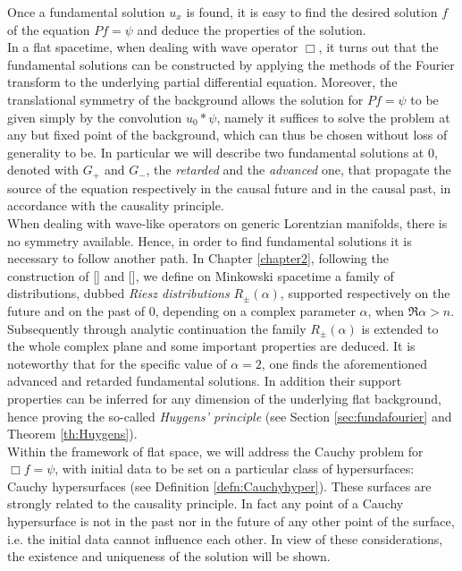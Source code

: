 \noindent Once a fundamental solution $u_x$ is found, it is easy to find the desired solution $f$ of the equation $Pf=\psi$ and deduce the properties of the solution.\\
In a flat spacetime, when dealing with wave operator $\Box$, it turns out that the fundamental solutions can be constructed by applying the methods of the Fourier transform to the underlying partial differential equation. Moreover, the translational symmetry of the background allows the solution for $Pf=\psi$ to be given simply by the convolution $u_0*\psi$, namely it suffices to solve the problem at any but fixed point of the background, which can thus be chosen without loss of generality to be. In particular we will describe two fundamental solutions at $0$, denoted with $G_+$ and $G_-$, the \emph{retarded} and the \emph{advanced} one, that propagate the source of the equation respectively in the causal future and in the causal past, in accordance with the causality principle.\\
When dealing with wave-like operators on generic Lorentzian manifolds, there is no symmetry available. Hence, in order to find fundamental solutions it is necessary to follow another path. In Chapter \ref{chapter2}, following the construction of [\citealp{bar1}] and [\citealp{ginoux}], we define on Minkowski spacetime a family of distributions, dubbed \emph{Riesz distributions} $R_\pm(\alpha)$, supported respectively on the future and on the past of $0$, depending on a complex parameter $\alpha$, when $\Re\alpha >n$. Subsequently through analytic continuation the family $R_\pm(\alpha)$ is extended to the whole complex plane and some important properties are deduced. It is noteworthy that for the specific value of $\alpha=2$, one finds the aforementioned advanced and retarded fundamental solutions. In addition their support properties can be inferred for any dimension of the underlying flat background, hence proving the so-called \emph{Huygens' principle} (see Section \ref{sec:fundafourier} and Theorem \ref{th:Huygens}).\\
Within the framework of flat space, we will address the Cauchy problem for $\Box f=\psi$, with initial data to be set on a particular class of hypersurfaces: Cauchy hypersurfaces (see Definition \ref{defn:Cauchyhyper}). These surfaces are strongly related to the causality principle. In fact any point of a Cauchy hypersurface is not in the past nor in the future of any other point of the surface, i.e. the initial data cannot influence each other. In view of these considerations, the existence and uniqueness of the solution will be shown.\\

